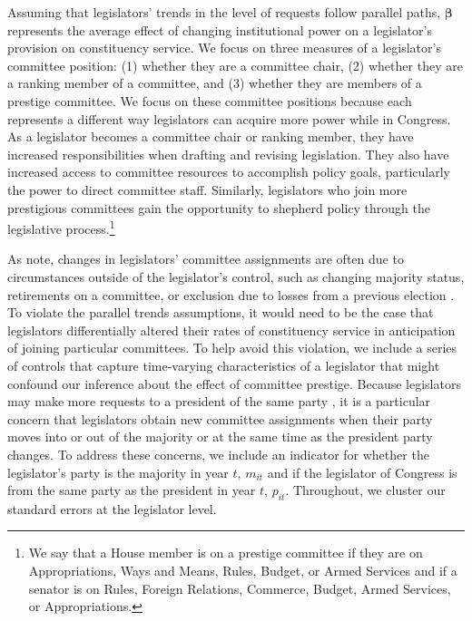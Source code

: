 \documentclass[12pt]{article}
\begin{document}
Assuming that legislators' trends in the level of requests follow parallel paths, $\boldsymbol{\beta}$ represents the average effect of changing institutional power on a legislator's provision on constituency service. We focus on three measures of a legislator's committee position: (1) whether they are a committee chair, (2) whether they are a ranking member of a committee, and (3) whether they are members of a prestige committee. We focus on these committee positions because each represents a different way legislators can acquire more power while in Congress. As a legislator becomes a committee chair or ranking member, they have increased responsibilities when drafting and revising legislation. They also have increased access to committee resources to accomplish policy goals, particularly the power to direct committee staff. Similarly, legislators who join more prestigious committees gain the opportunity to shepherd policy through the legislative process.\footnote{We say that a House member is on a prestige committee if they are on Appropriations, Ways and Means, Rules, Budget, or Armed Services and if a senator is on Rules, Foreign Relations, Commerce, Budget, Armed Services, or Appropriations.} %

As \cite{BerryFowler2016} note, changes in legislators' committee assignments are often due to circumstances outside of the legislator's control, such as changing majority status, retirements on a committee, or exclusion due to losses from a previous election \citep{GrimmerPowell2013}. To violate the parallel trends assumptions, it would need to be the case that legislators differentially altered their rates of constituency service in anticipation of joining particular committees. To help avoid this violation, we include a series of controls that capture time-varying characteristics of a legislator that might confound our inference about the effect of committee prestige. Because legislators may make more requests to a president of the same party \citep{BerryBurdenHowell09}, it is a particular concern that legislators obtain new committee assignments when their party moves into or out of the majority or at the same time as the president party changes. To address these concerns, we include an indicator for whether the legislator's party is the majority in year $t$, $m_{it}$ and if the legislator of Congress is from the same party as the president in year $t$, $p_{it}$. Throughout, we cluster our standard errors at the legislator level.
\end{document}
